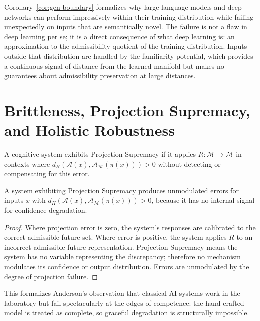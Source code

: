 \documentclass[12pt, a4paper, oneside]{book}
\newcommand{\Adm}{\mathcal{A}}
\newcommand{\M}{\mathcal{M}}
\newcommand{\proj}{\pi}
\newcommand{\dH}{d_H}
\begin{document}
\begin{remark}
Corollary~\ref{cor:gen-boundary} formalizes why large language models
and deep networks can perform impressively within their training
distribution while failing unexpectedly on inputs that are semantically
novel. The failure is not a flaw in deep learning per se; it is a direct
consequence of what deep learning is: an approximation to the admissibility
quotient of the training distribution. Inputs outside that distribution
are handled by the familiarity potential, which provides a continuous
signal of distance from the learned manifold but makes no guarantees
about admissibility preservation at large distances.
\end{remark}

\chapter{Brittleness, Projection Supremacy, and Holistic Robustness}
\label{ch:brittleness}

\begin{definition}
\label{def:projsupremacy}
A cognitive system exhibits Projection Supremacy if it applies $R : \M \to \M$
in contexts where $\dH(\Adm(x), \Adm_\M(\proj(x))) > 0$ without
detecting or compensating for this error.
\end{definition}

\begin{theorem}
\label{thm:brittleness}
A system exhibiting Projection Supremacy produces unmodulated errors for
inputs $x$ with $\dH(\Adm(x), \Adm_\M(\proj(x))) > 0$, because it has
no internal signal for confidence degradation.
\end{theorem}

\begin{proof}
Where projection error is zero, the system's responses are calibrated
to the correct admissible future set. Where error is positive, the system
applies $R$ to an incorrect admissible future representation. Projection
Supremacy means the system has no variable representing the discrepancy;
therefore no mechanism modulates its confidence or output distribution.
Errors are unmodulated by the degree of projection failure.
\end{proof}

\begin{remark}
This formalizes Anderson's observation that classical AI systems work in
the laboratory but fail spectacularly at the edges of competence: the
hand-crafted model is treated as complete, so graceful degradation is
structurally impossible.
\end{remark}
\end{document}
